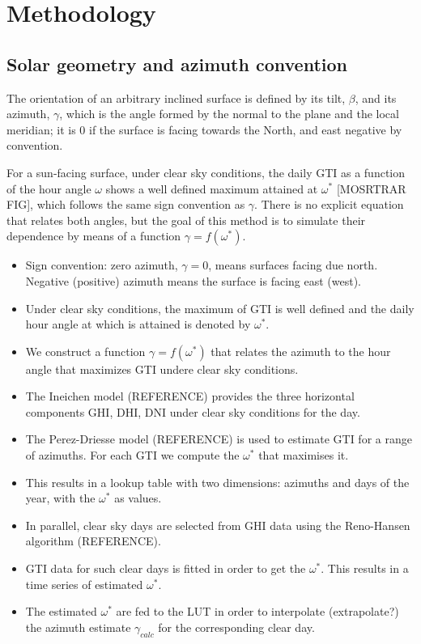 \section{Methodology}\label{sec:methodology}

\subsection{Solar geometry and azimuth convention}\label{subsec:geometry}

The orientation of an arbitrary inclined surface is defined by its tilt, $\beta$, and its azimuth, $\gamma$, which is the angle formed by the normal to the plane and the local meridian; it is 0 if the surface is facing towards the North, and east negative by convention.

For a sun-facing surface, under clear sky conditions, the daily GTI as a function of the hour angle $\omega$ shows a well defined maximum attained at $\omega^{*}$ [MOSRTRAR FIG], which follows the same sign convention as $\gamma$. There is no explicit equation that relates both angles, but the goal of this method is to simulate their dependence by means of a function  $\gamma=f(\omega^{*})$.

\begin{itemize}
	\item Sign convention: zero azimuth, $\gamma=0$, means surfaces facing due north. Negative (positive) azimuth means the surface is facing east (west).
	\item Under clear sky conditions, the maximum of GTI is well defined and the daily hour angle at which is attained is denoted by $\omega^{*}$.
	\item We construct a function $\gamma=f(\omega^{*})$ that relates the azimuth to the hour angle that maximizes GTI undere clear sky conditions.
	\item The Ineichen model (REFERENCE) provides the three horizontal components GHI, DHI, DNI under clear sky conditions for the day.
	\item The Perez-Driesse model (REFERENCE) is used to estimate GTI for a range of azimuths. For each GTI we compute the $\omega^{*}$ that maximises it.
	\item This results in a lookup table with two dimensions: azimuths and days of the year, with the $\omega^{*}$ as values.
	\item In parallel, clear sky days are selected from GHI data using the Reno-Hansen algorithm (REFERENCE).
	\item GTI data for such clear days is fitted in order to get the $\omega^{*}$. This results in a time series of estimated $\omega^{*}$.
	\item The estimated $\omega^{*}$ are fed to the LUT in order to interpolate (extrapolate?) the azimuth estimate  $\gamma_{calc}$ for the corresponding clear day. 
\end{itemize}



